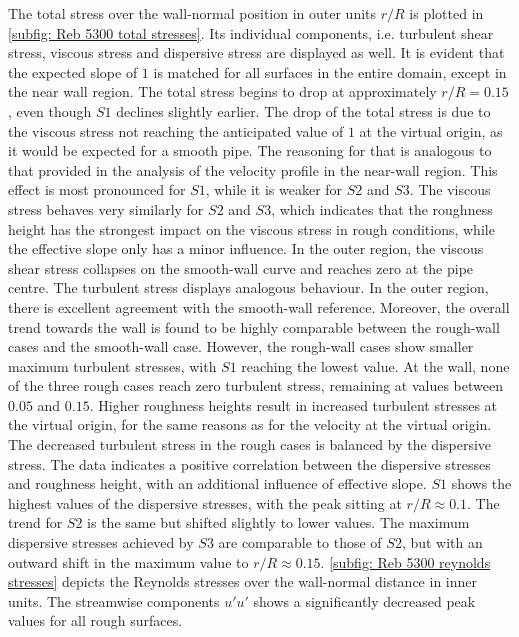 The total stress over the wall-normal position in outer units $r/R$ is plotted in \autoref{subfig: Reb 5300 total stresses}.
Its individual components, i.e. turbulent shear stress, viscous stress and dispersive stress are displayed as well.
It is evident that the expected slope of $1$ is matched for all surfaces in the entire domain, except in the near wall region. 
The total stress begins to drop at approximately $r/R = 0.15$, even though $S1$ declines slightly earlier.
The drop of the total stress is due to the viscous stress not reaching the anticipated value of $1$ at the virtual origin, as it would be expected for a smooth pipe.
The reasoning for that is analogous to that provided in the analysis of the velocity profile in the near-wall region.
This effect is most pronounced for $S1$, while it is weaker for $S2$ and $S3$.
The viscous stress behaves very similarly for $S2$ and $S3$, which indicates that the roughness height has the strongest impact on the viscous stress in rough conditions, while the effective slope only has a minor influence.
In the outer region, the viscous shear stress collapses on the smooth-wall curve and reaches zero at the pipe centre.
The turbulent stress displays analogous behaviour.
In the outer region, there is excellent agreement with the smooth-wall reference.
Moreover, the overall trend towards the wall is found to be highly comparable between the rough-wall cases and the smooth-wall case.
However, the rough-wall cases show smaller maximum turbulent stresses, with $S1$ reaching the lowest value.
At the wall, none of the three rough cases reach zero turbulent stress, remaining at values between $0.05$ and $0.15$.
Higher roughness heights result in increased turbulent stresses at the virtual origin, for the same reasons as for the velocity at the virtual origin.
The decreased turbulent stress in the rough cases is balanced by the dispersive stress.
The data indicates a positive correlation between the dispersive stresses and roughness height, with an additional influence of effective slope.
$S1$ shows the highest values of the dispersive stresses, with the peak sitting at $r/R \approx 0.1$.
The trend for $S2$ is the same but shifted slightly to lower values.
The maximum dispersive stresses achieved by $S3$ are comparable to those of $S2$, but with an outward shift in the maximum value to $r/R \approx 0.15$.
\autoref{subfig: Reb 5300 reynolds stresses} depicts the Reynolds stresses over the wall-normal distance in inner units.
The streamwise components $u'u'$ shows a significantly decreased peak values for all rough surfaces.
